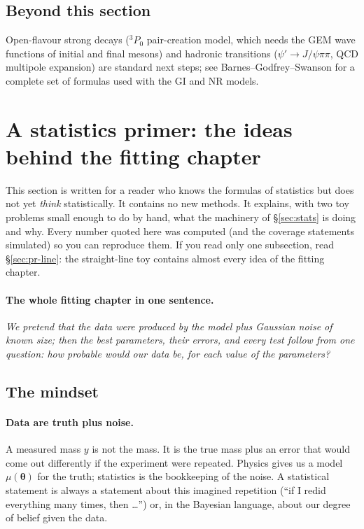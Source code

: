 \documentclass[11pt,a4paper]{article}
\numberwithin{equation}{section}
\theoremstyle{definition}
\theoremstyle{plain}
\theoremstyle{remark}
\numberwithin{algorithm}{section}
\newcommand{\vth}{\bm\theta}
\begin{document}
\subsection{Beyond this section}
Open-flavour strong decays (${}^3P_0$ pair-creation model, which needs the GEM wave functions of initial and final mesons) and hadronic transitions ($\psi'\to J/\psi\pi\pi$, QCD multipole expansion) are standard next steps; see Barnes--Godfrey--Swanson for a complete set of formulas used with the GI and NR models.
\section{A statistics primer: the ideas behind the fitting chapter}\label{sec:primer}

This section is written for a reader who knows the formulas of statistics but does not yet \emph{think} statistically. It contains no new methods. It explains, with two toy problems small enough to do by hand, what the machinery of \S\ref{sec:stats} is doing and why. Every number quoted here was computed (and the coverage statements simulated) so you can reproduce them. If you read only one subsection, read \S\ref{sec:pr-line}: the straight-line toy contains almost every idea of the fitting chapter.

\paragraph{The whole fitting chapter in one sentence.} \emph{We pretend that the data were produced by the model plus Gaussian noise of known size; then the best parameters, their errors, and every test follow from one question: how probable would our data be, for each value of the parameters?}

\subsection{The mindset}\label{sec:pr-mindset}
\paragraph{Data are truth plus noise.} A measured mass $y$ is not the mass. It is the true mass plus an error that would come out differently if the experiment were repeated. Physics gives us a model $\mu(\vth)$ for the truth; statistics is the bookkeeping of the noise. A statistical statement is always a statement about this imagined repetition (``if I redid everything many times, then \dots'') or, in the Bayesian language, about our degree of belief given the data.
\end{document}
